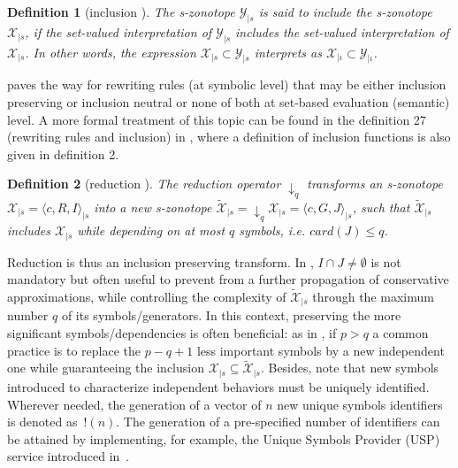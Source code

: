 \documentclass[journal]{IEEEtran}
\newtheorem{mydefinition}{Definition}
\begin{document}
\begin{mydefinition}[inclusion \cite{combastel2020functional}] \label{def:inclusion}
The s-zonotope $\mathcal{Y}_{|s}$  is said to include the s-zonotope $\mathcal{X}_{|s}$, if the set-valued interpretation of $\mathcal{Y}_{|s}$ includes the set-valued interpretation of $\mathcal{X}_{|s}$. In other words, the expression $\mathcal{X}_{|s} \subset \mathcal{Y}_{|s}$ interprets as $\mathcal{X}_{|\iota} \subset \mathcal{Y}_{|\iota}$.
\end{mydefinition}

  paves the way for rewriting rules (at symbolic level) that may be either inclusion preserving or inclusion neutral or none of both at set-based evaluation (semantic) level. A more formal treatment of this topic can be found in the definition 27 (rewriting rules and inclusion) in \cite{combastel2020functional}, 
where a definition of inclusion functions is also given in definition 2. 

\begin{mydefinition}[reduction \cite{combastel2020functional}] \label{def:reduction}
The reduction operator $\downarrow_q $ transforms an s-zonotope $\mathcal{X}_{|s} = \langle c, R, I\rangle_{|s}$ into a new s-zonotope $\tilde{\mathcal{X}}_{|s} = \downarrow_q \mathcal{X}_{|s} = \langle c, G, J\rangle_{|s}$, such that  $\tilde{\mathcal{X}}_{|s}$ includes $\mathcal{X}_{|s}$ while depending on at most $q$ symbols, i.e. $card(J) \leq q$.
\end{mydefinition}

Reduction is thus an inclusion preserving transform. In , $I \cap J \neq \emptyset $ is not mandatory but often useful to prevent from a further propagation of conservative approximations, while controlling the complexity of $\tilde{\mathcal{X}}_{|s}$ through the maximum number $q$ of its symbols/generators. In this context, preserving the more significant symbols/dependencies is often beneficial: as in \cite{combastel2020distributed}, 
if $p>q$ a common practice is to replace the $p-q+1$ less important symbols by a new independent one while guaranteeing the inclusion $\mathcal{X}_{|s} \subseteq \tilde{\mathcal{X}}_{|s}$. Besides, note that  new symbols introduced to characterize independent behaviors must be uniquely identified. Wherever needed, the generation of a vector of $n$ new  unique symbols identifiers is denoted as~$!(n)$. The generation of a pre-specified number of identifiers can be attained  by implementing, for example, the Unique Symbols Provider (USP) service introduced in~\cite{combastel2020distributed}.
\end{document}
